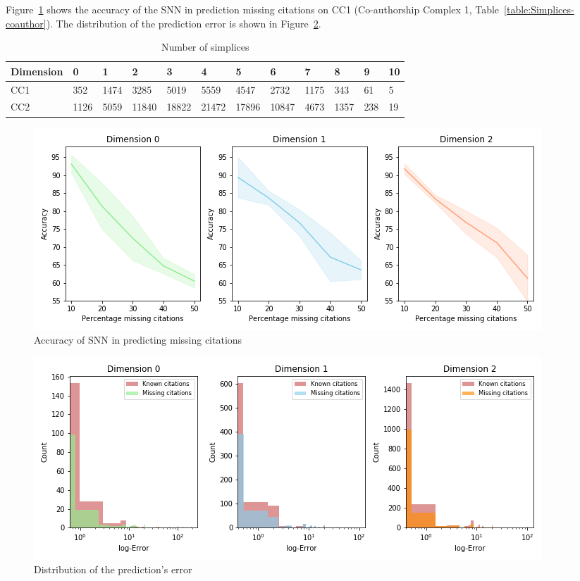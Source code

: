 Figure~\ref{fig:accuracy} shows the accuracy of the SNN in prediction missing citations on CC1 (Co-authorship Complex 1, Table~\ref{table:Simplices-coauthor}). The distribution of the prediction error is shown in Figure~\ref{fig:error}. 
\begin{table}
  \caption{%
  Number of simplices
  }
  \label{Simplices-coauthor}
  \centering
  \begin{tabular}{llllllllllll}
    \cmidrule(r){1-12}
    Dimension   & 0     & 1  & 2     & 3 & 4     & 5 & 6    & 7 & 8   & 9 & 10\\
    \midrule
    CC1 & 352  & 1474  & 3285  & 5019  & 5559  & 4547  & 2732  & 1175  & 343 & 61 & 5\\
    CC2 & 1126 & 5059 & 11840 & 18822 & 21472 & 17896  & 10847 & 4673 & 1357 & 238 & 19\\ 
    \bottomrule
  \end{tabular}
\end{table}
 
\begin{figure}[htbp]
  \centering 
\includegraphics[scale=0.4]{./figures/accuracy_network1.png}
 \caption{Accuracy of SNN in predicting missing citations } \label{fig:accuracy}
\end{figure}
\begin{figure}[htbp]

  \centering
 \hspace{-6cm}
 
\includegraphics[scale=0.4]{./figures/Error_dist_start150250_seed6666_notsee40.png}
  \caption{Distribution of the prediction's error} \label{fig:error}
\end{figure}

